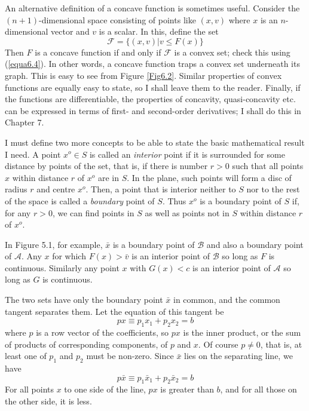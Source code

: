 An alternative definition of a concave function is sometimes useful. Consider the $(n+1)$-dimensional space consisting of points like $(x,v)$ where $x$ is an $n$-dimensional vector and $v$ is a scalar. In this, define the set
\begin{equation*}  
  \mathcal{F} = \{  (x,v) | v \leq F(x)   \}
\end{equation*}
Then $F$ is a concave function if and only if $\mathcal{F}$ is a convex set; check this using ({\ref{equa6.4}}). In other words, a concave function traps a convex set underneath its graph. This is easy to see from Figure \ref{Fig6.2}. Similar properties of convex functions are equally easy to state, so I shall leave them to the reader. Finally, if the functions are differentiable, the properties of concavity, quasi-concavity etc. can be expressed in terms of first- and second-order derivatives; I shall do this in Chapter 7.

I must define two more concepts to be able to state the basic mathematical result I need. A point $x^o \in S $ is called an \textit{interior} point if it is surrounded for some distance by points of the set, that is, if there is number $r>0$ such that all points $x$ within distance $r$ of $x^o$ are in $S$. In the plane, such points will form a disc of radius $r$ and centre $x^o$. Then, a point that is interior neither to $S$ nor to the rest of the space is called a \textit{boundary} point of $S$. Thus $x^o$ is a boundary point of $S$ if, for any $r>0$, we can find points in $S$ as well as points not in $S$ within distance $r$ of $x^o$.

In Figure 5.1, for example, $\bar{x}$ is a boundary point of $\mathcal{B}$ and also a boundary point of $\mathcal{A}$. Any $x$ for which $F(x)>\bar{v}$ is an interior point of $\mathcal{B}$ so long as $F$ is continuous. Similarly any point $x$ with $G(x) < c$ is an interior point of $\mathcal{A}$ so long as $G$ is continuous.

The two sets have only the boundary point $\bar{x}$ in common, and the common tangent separates them. Let the equation of this tangent be 
\begin{equation*}
 px \equiv p_1 x_1 + p_2 x_2 = b
\end{equation*}
where $p$ is a row vector of the coefficients, so $px$ is the inner product, or the sum of products of corresponding components, of $p$ and $x$. Of course $p \neq 0$, that is, at least one of $p_1$ and $p_2$ must be non-zero. Since $\bar{x}$ lies on the separating line, we have
\begin{equation*}
 p\bar{x} \equiv p_1 \bar{x}_1 + p_2 \bar{x}_2 = b
\end{equation*}
For all points $x$ to one side of the line, $px$ is greater than $b$, and for all those on the other side, it is less.

